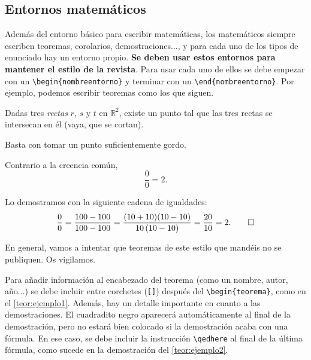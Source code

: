 \documentclass{TEMat-article}
\begin{document}
\subsection{Entornos matemáticos}

Además del entorno básico para escribir matemáticas, los matemáticos siempre escriben teoremas, corolarios, demostraciones..., y para cada uno de los tipos de enunciado hay un entorno propio.
\textbf{Se deben usar estos entornos para mantener el estilo de la revista}.
Para usar cada uno de ellos se debe empezar con un \verb+\begin{nombreentorno}+ y terminar con un \verb+\end{nombreentorno}+.
Por ejemplo, podemos escribir teoremas como los que siguen.

\begin{teorema}\label{teor:ejemplo1}
Dadas tres \emph{rectas} $r$,\/ $s$ y\/ $t$ en\/ $\mathbb{R}^2$, existe un punto tal que las tres rectas se intersecan en él (vaya, que se cortan).
\end{teorema}

\begin{demostracion}
Basta con tomar un punto suficientemente gordo.
\end{demostracion}

\begin{teorema}\label{teor:ejemplo2}
Contrario a la creencia común,
\[\frac{0}{0}=2.\]
\end{teorema}

\begin{demostracion}
Lo demostramos con la siguiente cadena de igualdades:
\[\frac{0}{0}=\frac{100-100}{100-100}=\frac{(10+10)(10-10)}{10\,(10-10)}=\frac{20}{10}=2.\qedhere\]
\end{demostracion}

\begin{nota*}
En general, vamos a intentar que teoremas de este estilo que mandéis no se publiquen. Os vigilamos.
\end{nota*}

Para añadir información al encabezado del teorema (como un nombre, autor, año...) se debe incluir entre corchetes (\verb+[]+) después del \verb+\begin{teorema}+, como en el \autoref{teor:ejemplo1}.
Además, hay un detalle importante en cuanto a las demostraciones.
El cuadradito negro aparecerá automáticamente al final de la demostración, pero no estará bien colocado si la demostración acaba con una fórmula.
En ese caso, se debe incluir la instrucción \verb+\qedhere+ al final de la última fórmula, como sucede en la demostración del \autoref{teor:ejemplo2}.
\end{document}
